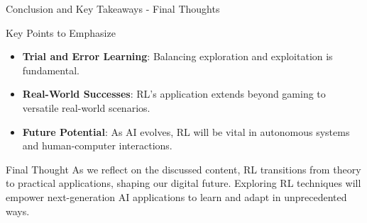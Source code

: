\documentclass[aspectratio=169]{beamer}
\begin{document}
\begin{frame}[fragile]{Conclusion and Key Takeaways - Final Thoughts}
    \begin{block}{Key Points to Emphasize}
        \begin{itemize}
            \item \textbf{Trial and Error Learning}: Balancing exploration and exploitation is fundamental.
            \item \textbf{Real-World Successes}: RL's application extends beyond gaming to versatile real-world scenarios.
            \item \textbf{Future Potential}: As AI evolves, RL will be vital in autonomous systems and human-computer interactions.
        \end{itemize}
    \end{block}

    \begin{block}{Final Thought}
        As we reflect on the discussed content, RL transitions from theory to practical applications, shaping our digital future. Exploring RL techniques will empower next-generation AI applications to learn and adapt in unprecedented ways.
    \end{block}
\end{frame}
\end{document}
